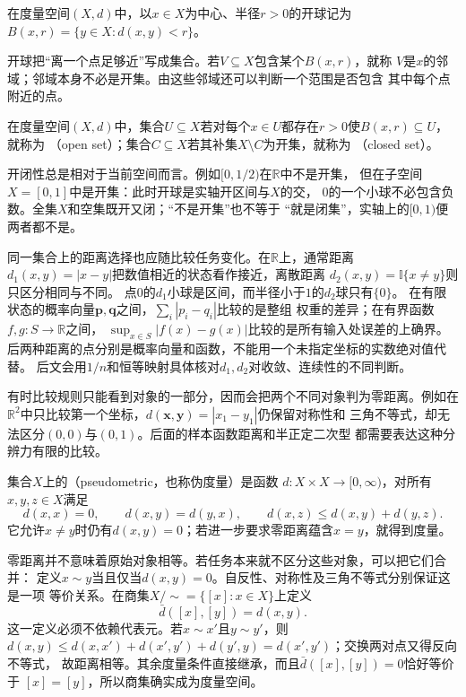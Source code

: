 \begin{definition}[开球]
\label{def:analysis-open-ball}
在度量空间$(X,d)$中，以$x\in X$为中心、半径$r>0$的开球记为
$B(x,r)=\{y\in X:d(x,y)<r\}$。
\end{definition}

开球把“离一个点足够近”写成集合。若$V\subseteq X$包含某个$B(x,r)$，就称
$V$是$x$的邻域；邻域本身不必是开集。由这些邻域还可以判断一个范围是否包含
其中每个点附近的点。

\begin{definition}[开集与闭集]
\label{def:analysis-open-closed-sets}
在度量空间$(X,d)$中，集合$U\subseteq X$若对每个$x\in U$都存在$r>0$使$B(x,r)\subseteq U$，就称为
（open set）；集合$C\subseteq X$若其补集$X\setminus C$为开集，就称为
（closed set）。
\end{definition}

开闭性总是相对于当前空间而言。例如$[0,1/2)$在$\mathbb R$中不是开集，
但在子空间$X=[0,1]$中是开集：此时开球是实轴开区间与$X$的交，
$0$的一个小球不必包含负数。全集$X$和空集既开又闭；“不是开集”也不等于
“就是闭集”，实轴上的$[0,1)$便两者都不是。

同一集合上的距离选择也应随比较任务变化。在$\mathbb R$上，通常距离
$d_1(x,y)=|x-y|$把数值相近的状态看作接近，离散距离
$d_2(x,y)=\mathbb I\{x\neq y\}$则只区分相同与不同。
点$0$的$d_1$小球是区间，而半径小于$1$的$d_2$球只有$\{0\}$。
在有限状态的概率向量$\bm p,\bm q$之间，$\sum_i|p_i-q_i|$比较的是整组
权重的差异；在有界函数$f,g:S\to\mathbb R$之间，
$\sup_{x\in S}|f(x)-g(x)|$比较的是所有输入处误差的上确界。
后两种距离的点分别是概率向量和函数，不能用一个未指定坐标的实数绝对值代替。
后文会用$1/n$和恒等映射具体核对$d_1,d_2$对收敛、连续性的不同判断。

有时比较规则只能看到对象的一部分，因而会把两个不同对象判为零距离。例如在
$\mathbb R^2$中只比较第一个坐标，$d(\bm x,\bm y)=|x_1-y_1|$仍保留对称性和
三角不等式，却无法区分$(0,0)$与$(0,1)$。后面的样本函数距离和半正定二次型
都需要表达这种分辨力有限的比较。
\begin{definition}[伪距离]
\label{def:analysis-pseudometric}
集合$X$上的（pseudometric，也称伪度量）是函数
$d:X\times X\to[0,\infty)$，对所有$x,y,z\in X$满足
\[
 d(x,x)=0,\qquad d(x,y)=d(y,x),\qquad d(x,z)\leq d(x,y)+d(y,z).
\]
它允许$x\neq y$时仍有$d(x,y)=0$；若进一步要求零距离蕴含$x=y$，就得到度量。
\end{definition}
零距离并不意味着原始对象相等。若任务本来就不区分这些对象，可以把它们合并：
定义$x\sim y$当且仅当$d(x,y)=0$。自反性、对称性及三角不等式分别保证这是一项
等价关系。在商集$X/{\sim}=\{[x]:x\in X\}$上定义
\begin{equation}
 \bar d([x],[y])=d(x,y).
\label{eq:analysis-quotient-metric}
\end{equation}
这一定义必须不依赖代表元。若$x\sim x'$且$y\sim y'$，则
$d(x,y)\leq d(x,x')+d(x',y')+d(y',y)=d(x',y')$；交换两对点又得反向不等式，
故距离相等。其余度量条件直接继承，而且$\bar d([x],[y])=0$恰好等价于
$[x]=[y]$，所以商集确实成为度量空间。

